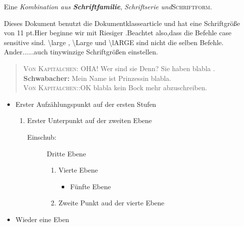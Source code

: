 \documentclass{scrartcl}
\begin{document}
\begin{sffamily} %
Eine \textit{Kombination aus \textbf{Schriftfamilie}}, {\slshape {\ttfamily Schriftserie} und}{\scshape Schriftform}.
\end{sffamily}  %


Dieses Dokument benutzt die Dokumentklasse\glq article\grq{} und hat eine Schriftgröße von 11 pt.Hier beginne wir mit {\Huge\glqq Riesiger \grqq}.Beachtet also,dass die Befehle \flqq case sensitive\frqq{} sind.
{\large\glqq\textbackslash large \grqq},
{\Large\glqq\textbackslash Large \grqq} und
{\LARGE\glqq\textbackslash lARGE}
sind nicht die selben Befehle.
Ander......auch {tiny\glqq winzige \grqq} Schriftgrößen einstellen.



\begin{verse}
\textsc{Von Kapitälchen:} OHA! Wer sind sie Denn? Sie haben blabla .\\
\textbf{Schwabacher:} Mein Name ist Prinzessin  blabla.\\
\textsc{Von Käpitälchen:}:OK blabla kein Bock mehr abzuschreiben.
\end{verse}



\begin{itemize}
\item Erster Aufzählungspunkt auf der ersten Stufen
 \begin{enumerate}
 \item Erster Unterpunkt auf der zweiten Ebene
  \begin{description}
  \item[Einschub:] Dritte  Ebene
  
      \begin{enumerate}
      \item Vierte Ebene
       \begin{itemize}
         \item Fünfte Ebene
       \end{itemize}
      \item Zweite Punkt aud der vierte Ebene
    \end{enumerate}
  
   \end{description}

  \end{enumerate}

\item Wieder eine Eben

\end{itemize}
\end{document}
